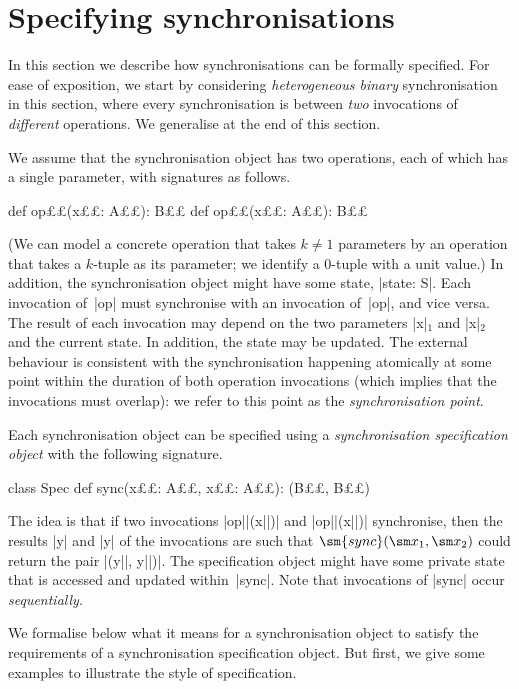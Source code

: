 \section{Specifying synchronisations}
\label{sec:spec}

In this section we describe how synchronisations can be formally specified.
For ease of exposition, we start by considering \emph{heterogeneous binary}
synchronisation in this section, where every synchronisation is between
\emph{two} invocations of \emph{different} operations.  We generalise at the
end of this section.

We assume that the synchronisation object has two operations, each of which
has a single parameter, with signatures as follows.
%
\begin{scala}
  def op££(x££: A££): B££
  def op££(x££: A££): B££
\end{scala}
%
(We can model a concrete operation that takes $k \ne 1$ parameters by an
operation that takes a $k$-tuple as its parameter; we identify a 0-tuple with a
unit value.)
%
In addition, the synchronisation object might have some state, |state: S|.
Each invocation of~|op| must synchronise with an invocation of~|op|, and
vice versa.  The result of each invocation may depend on the two parameters
|x|$_1$ and |x|$_2$ and the current state.  In addition, the state may be
updated.  The external behaviour is consistent with the synchronisation
happening atomically at some point within the duration of both operation
invocations (which implies that the invocations must overlap): we refer to this
point as the \emph{synchronisation point}.

Each synchronisation object can be specified using a \emph{synchronisation
  specification object} with the following signature.
%
\begin{scala}
class Spec{
  def sync(x££: A££, x££: A££): (B££, B££)
}
\end{scala}
%
The idea is that if two invocations |op||(x||)| and |op||(x||)|
synchronise, then the results |y| and |y| of the invocations are such
that $\sm{sync}(\sm x_1, \sm x_2)$ could return the pair |(y||, y||)|.
The specification object might have some private state that is accessed and
updated within~|sync|.  Note that invocations of |sync| occur
\emph{sequentially}.

We formalise below what it means for a synchronisation object to satisfy the
requirements of a synchronisation specification object.  But first, we give
some examples to illustrate the style of specification. 


